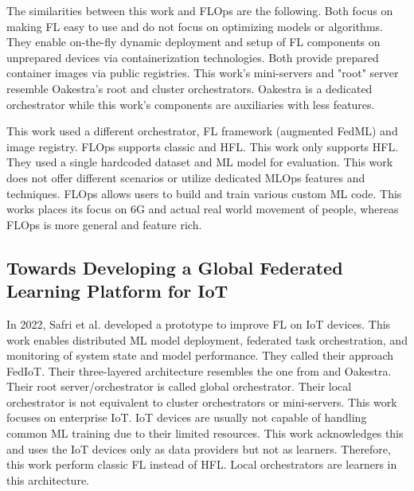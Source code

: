 The similarities between this work and FLOps are the following.
Both focus on making FL easy to use and do not focus on optimizing models or algorithms.
They enable on-the-fly dynamic deployment and setup of FL components on unprepared devices via containerization technologies.
Both provide prepared container images via public registries.
This work's mini-servers and "root" server resemble Oakestra's root and cluster orchestrators.
Oakestra is a dedicated orchestrator while this work's components are auxiliaries with less features.

This work used a different orchestrator, FL framework (augmented FedML) and image registry.
FLOps supports classic and HFL.
This work only supports HFL.
They used a single hardcoded dataset and ML model for evaluation.
This work does not offer different scenarios or utilize dedicated MLOps features and techniques.
FLOps allows users to build and train various custom ML code.
This works places its focus on 6G and actual real world movement of people, whereas FLOps is more general and feature rich.


\subsection{Towards Developing a Global Federated Learning Platform for IoT}
In 2022, Safri et al. \cite{paper:global_fl_platform_for_iot} developed a prototype to improve FL on IoT devices.
This work enables distributed ML model deployment, federated task orchestration, and monitoring of system state and model performance.
They called their approach FedIoT.
Their three-layered architecture resembles the one from \cite{paper:fl_toward_on_demand_client_deployment_at_edge} and Oakestra.
Their root server/orchestrator is called global orchestrator.
Their local orchestrator is not equivalent to cluster orchestrators or mini-servers.
This work focuses on enterprise IoT.
IoT devices are usually not capable of handling common ML training due to their limited resources.
This work acknowledges this and uses the IoT devices only as data providers but not as learners.
Therefore, this work perform classic FL instead of HFL.
Local orchestrators are learners in this architecture.

